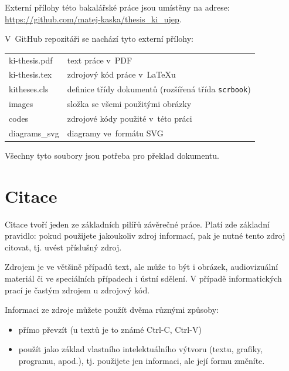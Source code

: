 \documentclass[male,czech,api_bc]{kitheses}
\begin{document}
Externí přílohy této bakalářské práce jsou umístěny na adrese:\\ \url{https://github.com/matej-kaska/thesis_ki_ujep}.

V~GitHub repozitáři se nachází tyto externí přílohy:

\begin{longtable}{ll}
	\hline
	ki-thesis.pdf & text práce v~PDF \\
	ki-thesis.tex & zdrojový kód práce v~\LaTeX{}u \\
	kitheses.cls & definice třídy dokumentů (rozšířená třída \texttt{scrbook})\\
	images & složka se všemi použitými obrázky \\
	codes & zdrojové kódy použité v~této práci \\
	diagrams\_svg & diagramy ve~formátu SVG \\
	\hline
\end{longtable}

Všechny tyto soubory jsou potřeba pro překlad dokumentu.























\chapter{Citace}

Citace tvoří jeden ze základních pilířů závěrečné práce. Platí zde základní pravidlo: pokud použijete 
jakoukoliv zdroj informací, pak je nutné tento zdroj citovat, tj. uvést příslušný zdroj.

Zdrojem je ve většině případů text, ale může to být i obrázek, audiovizuální materiál či ve speciálních případech i ústní sdělení. V případě informatických prací je častým zdrojem u zdrojový kód.

Informaci ze zdroje můžete použít dvěma různými způsoby:

\begin{itemize}
\item přímo převzít (u textů je to známé Ctrl-C, Ctrl-V)
\item použít jako základ vlastního intelektuálního výtvoru (textu, grafiky, programu, apod.), tj. použijete jen informaci, ale její formu změníte.
\end{itemize}
\end{document}

